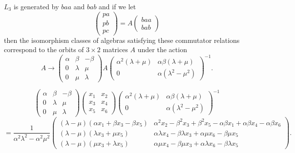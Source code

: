 \documentclass[10pt,thmsa]{article}
\begin{document}
$L_{3}$ is generated by $baa$ and $bab$ and if we let 
\[
\left( 
\begin{array}{l}
pa \\ 
pb \\ 
pc%
\end{array}%
\right) =A\left( 
\begin{array}{l}
baa \\ 
bab%
\end{array}%
\right) 
\]%
then the isomorphism classes of algebras satisfying these commutator
relations correspond to the orbits of $3\times 2$ matrices $A$ under the
action 
\[
A\rightarrow \left( 
\begin{array}{lll}
\alpha & \beta & -\beta \\ 
0 & \lambda & \mu \\ 
0 & \mu & \lambda%
\end{array}%
\right) A\left( 
\begin{array}{ll}
\alpha ^{2}(\lambda +\mu ) & \alpha \beta (\lambda +\mu ) \\ 
0 & \alpha (\lambda ^{2}-\mu ^{2})%
\end{array}%
\right) ^{-1}. 
\]

\[
\left( 
\begin{array}{lll}
\alpha & \beta & -\beta \\ 
0 & \lambda & \mu \\ 
0 & \mu & \lambda%
\end{array}%
\right) \left( 
\begin{array}{cc}
x_{1} & x_{2} \\ 
x_{3} & x_{4} \\ 
x_{5} & x_{6}%
\end{array}%
\right) \left( 
\begin{array}{ll}
\alpha ^{2}(\lambda +\mu ) & \alpha \beta (\lambda +\mu ) \\ 
0 & \alpha (\lambda ^{2}-\mu ^{2})%
\end{array}%
\right) ^{-1} 
\]
\[
=\frac{1}{\alpha ^{2}\lambda ^{2}-\alpha ^{2}\mu ^{2}}\left( 
\begin{array}{cc}
\left( \lambda -\mu \right) \left( \alpha x_{1}+\beta x_{3}-\beta
x_{5}\right) & \alpha ^{2}x_{2}-\beta ^{2}x_{3}+\beta ^{2}x_{5}-\alpha \beta
x_{1}+\alpha \beta x_{4}-\alpha \beta x_{6} \\ 
\left( \lambda -\mu \right) \left( \lambda x_{3}+\mu x_{5}\right) & \alpha
\lambda x_{4}-\beta \lambda x_{3}+\alpha \mu x_{6}-\beta \mu x_{5} \\ 
\left( \lambda -\mu \right) \left( \mu x_{3}+\lambda x_{5}\right) & \alpha
\mu x_{4}-\beta \mu x_{3}+\alpha \lambda x_{6}-\beta \lambda x_{5}%
\end{array}%
\right) . 
\]%
$\allowbreak \allowbreak $
\end{document}

